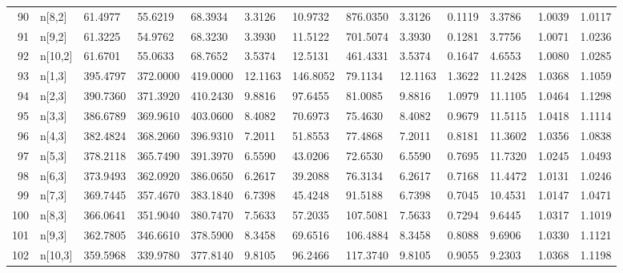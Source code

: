 \begin{table}[ht]
\begin{tabular}{rllllllllllll}
  90 & n[8,2] &  61.4977 &  55.6219 &  68.3934 &  3.3126 &   10.9732 &  876.0350 &  3.3126 & 0.1119 &  3.3786 & 1.0039 & 1.0117 \\ 
  91 & n[9,2] &  61.3225 &  54.9762 &  68.3230 &  3.3930 &   11.5122 &  701.5074 &  3.3930 & 0.1281 &  3.7756 & 1.0071 & 1.0236 \\ 
  92 & n[10,2] &  61.6701 &  55.0633 &  68.7652 &  3.5374 &   12.5131 &  461.4331 &  3.5374 & 0.1647 &  4.6553 & 1.0080 & 1.0285 \\ 
  93 & n[1,3] & 395.4797 & 372.0000 & 419.0000 & 12.1163 &  146.8052 &   79.1134 & 12.1163 & 1.3622 & 11.2428 & 1.0368 & 1.1059 \\ 
  94 & n[2,3] & 390.7360 & 371.3920 & 410.2430 &  9.8816 &   97.6455 &   81.0085 &  9.8816 & 1.0979 & 11.1105 & 1.0464 & 1.1298 \\ 
  95 & n[3,3] & 386.6789 & 369.9610 & 403.0600 &  8.4082 &   70.6973 &   75.4630 &  8.4082 & 0.9679 & 11.5115 & 1.0418 & 1.1114 \\ 
  96 & n[4,3] & 382.4824 & 368.2060 & 396.9310 &  7.2011 &   51.8553 &   77.4868 &  7.2011 & 0.8181 & 11.3602 & 1.0356 & 1.0838 \\ 
  97 & n[5,3] & 378.2118 & 365.7490 & 391.3970 &  6.5590 &   43.0206 &   72.6530 &  6.5590 & 0.7695 & 11.7320 & 1.0245 & 1.0493 \\ 
  98 & n[6,3] & 373.9493 & 362.0920 & 386.0650 &  6.2617 &   39.2088 &   76.3134 &  6.2617 & 0.7168 & 11.4472 & 1.0131 & 1.0246 \\ 
  99 & n[7,3] & 369.7445 & 357.4670 & 383.1840 &  6.7398 &   45.4248 &   91.5188 &  6.7398 & 0.7045 & 10.4531 & 1.0147 & 1.0471 \\ 
  100 & n[8,3] & 366.0641 & 351.9040 & 380.7470 &  7.5633 &   57.2035 &  107.5081 &  7.5633 & 0.7294 &  9.6445 & 1.0317 & 1.1019 \\ 
  101 & n[9,3] & 362.7805 & 346.6610 & 378.5900 &  8.3458 &   69.6516 &  106.4884 &  8.3458 & 0.8088 &  9.6906 & 1.0330 & 1.1121 \\ 
  102 & n[10,3] & 359.5968 & 339.9780 & 377.8140 &  9.8105 &   96.2466 &  117.3740 &  9.8105 & 0.9055 &  9.2303 & 1.0368 & 1.1198 \\ 
   \hline
\end{tabular}
\end{table}
